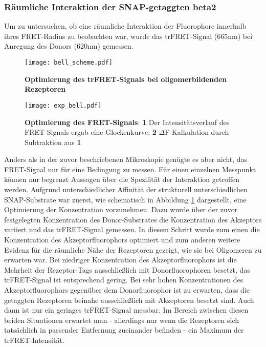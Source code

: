 \subsubsection{Räumliche Interaktion der SNAP-getaggten \gls{beta2}}
\label{bell}
Um zu untersuchen, ob eine räumliche Interaktion der Fluorophore innerhalb ihres FRET-Radius zu beobachten war, wurde das trFRET-Signal (665nm) bei Anregung des Donors (620nm) gemessen. 

\begin{figure}[htb]
	\centering
    \texttt{[image: bell\_scheme.pdf]}
    \caption{\textbf{Optimierung des trFRET-Signals bei oligomerbildenden Rezeptoren}}
\label{fig:bell}
\end{figure}

\begin{figure}[H]
	\centering
    \texttt{[image: exp\_bell.pdf]}
    \caption{\textbf{Optimierung des FRET-Signals}: \textbf{1} Der Intensitätsverlauf des FRET-Signals ergab eine Glockenkurve;  \textbf{2} $\Delta$F-Kalkulation durch Subtraktion aus \textbf{1}} 
    \label{fig:exp_bell}
\end{figure}

Anders als in der zuvor beschriebenen Mikroskopie genügte es aber nicht, das FRET-Signal nur für eine Bedingung zu messen. Für einen einzelnen Messpunkt können nur begrenzt Aussagen über die Spezifität der Interaktion getroffen werden. Aufgrund unterschiedlicher Affinität der strukturell unterschiedlichen SNAP-Substrate war zuerst, wie schematisch in Abbildung \ref{fig:bell} dargestellt, eine Optimierung der Konzentration vorzunehmen. Dazu wurde über der zuvor festgelegten Konzentration des Donor-Substrates die Konzentration des Akzeptors variiert und das trFRET-Signal gemessen. In diesem Schritt wurde zum einen die Konzentration des Akzeptorfluorophors optimiert und zum anderen weitere Evidenz für die räumliche Nähe der Rezeptoren gezeigt, wie sie bei Oligomeren zu erwarten war. Bei niedriger Konzentration des Akzeptorfluorophors ist die Mehrheit der Rezeptor-Tags ausschließlich mit Donorfluorophoren besetzt, das trFRET-Signal ist entsprechend gering. Bei sehr hohen Konzentrationen des Akzeptorfluorophors gegenüber dem Donorfluorophor ist zu erwarten, dass die getaggten Rezeptoren beinahe ausschließlich mit Akzeptoren besetzt sind. Auch dann ist nur ein geringes trFRET-Signal messbar. Im Bereich zwischen diesen beiden Situationen erwartet man - allerdings nur wenn die Rezeptoren sich tatsächlich in passender Entfernung zueinander befinden - ein Maximum der trFRET-Intensität.

